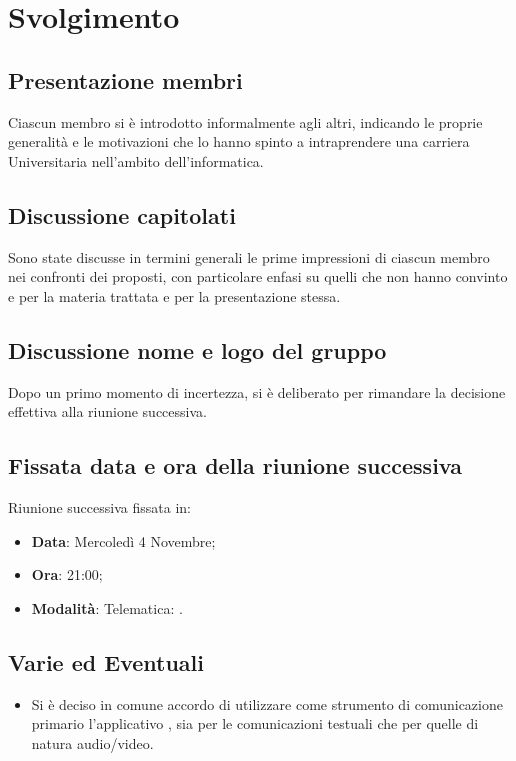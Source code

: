 \documentclass[]{article}
\begin{document}
	\newpage

	\section{Svolgimento}
		\subsection{Presentazione membri}
		Ciascun membro si è introdotto informalmente agli altri, indicando le proprie generalità e le motivazioni che lo hanno spinto a intraprendere una carriera Universitaria nell'ambito dell'informatica.\\
	
		\subsection{Discussione capitolati}
		Sono state discusse in termini generali le prime impressioni di ciascun membro nei confronti dei  proposti, con particolare enfasi su quelli che non hanno convinto e per la materia trattata e per la presentazione stessa.\\
	
		\subsection{Discussione nome e logo del gruppo}
		Dopo un primo momento di incertezza, si è deliberato per rimandare la decisione effettiva alla riunione successiva.\\
	
		\subsection{Fissata data e ora della riunione successiva}
		Riunione successiva fissata in:
		\begin{itemize}
			\item \textbf{Data}: Mercoledì 4 Novembre;
			\item \textbf{Ora}: 21:00;
			\item \textbf{Modalità}: Telematica: .\\
		\end{itemize}
	
		\subsection{Varie ed Eventuali}
		\begin{itemize}
			\item Si è deciso in comune accordo di utilizzare come strumento di comunicazione primario l'applicativo , sia per le comunicazioni testuali che per quelle di natura audio/video.
		\end{itemize}
	
\end{document}
